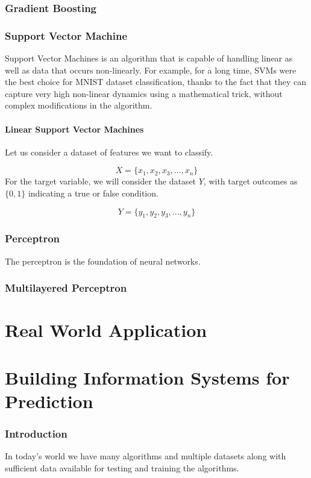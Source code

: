 \documentclass[12pt]{article}
\begin{document}
\newpage
\section{Gradient Boosting}

\newpage
\section{Support Vector Machine}
Support Vector Machines is an algorithm that is capable of handling 
linear as well as data that occurs non-linearly. For example, for a long time, SVMs were the best
choice for MNIST dataset classification, thanks to the fact that they can capture very high
non-linear dynamics using a mathematical trick, without complex modifications in the
algorithm.

\subsection{Linear Support Vector Machines}
Let us consider a dataset of features we want to classify.

$$
X = \lbrace x_{1}, x_{2}, x_{3}, ... , x_{n} \rbrace 
$$ For the target variable, we will consider the dataset $Y$, with target outcomes as $\lbrace0,1\rbrace$ indicating a true or false condition.

$$
Y = \lbrace y_{1}, y_{2}, y_{3}, ... , y_{n} \rbrace 
$$

\newpage
\section{Perceptron}
The perceptron is the foundation of neural networks.

\newpage
\section{Multilayered Perceptron}

\newpage
\part{Real World Application}

\newpage
\part{Building Information Systems for Prediction}
\section{Introduction}
In today's world we have many algorithms and multiple datasets along with sufficient data available for testing and training the algorithms.
\end{document}
